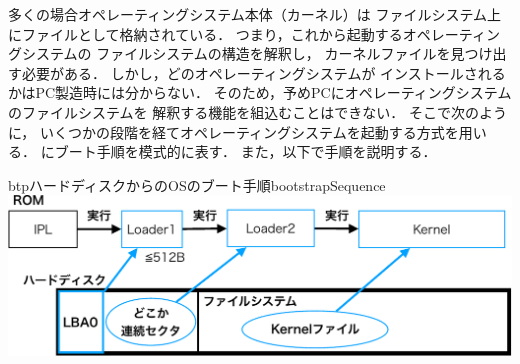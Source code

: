 多くの場合オペレーティングシステム本体（カーネル）は
ファイルシステム上にファイルとして格納されている．
つまり，これから起動するオペレーティングシステムの
ファイルシステムの構造を解釈し，
カーネルファイルを見つけ出す必要がある．
しかし，どのオペレーティングシステムが
インストールされるかはPC製造時には分からない．
そのため，予めPCにオペレーティングシステムのファイルシステムを
解釈する機能を組込むことはできない．
そこで次のように，
いくつかの段階を経てオペレーティングシステムを起動する方式を用いる．
にブート手順を模式的に表す．
また，以下で手順を説明する．

\begin{myfig}{btp}{ハードディスクからのOSのブート手順}{bootstrapSequence}
  \includegraphics[scale=0.66]{Fig/bootstrapSequence-crop.pdf}
\end{myfig}


